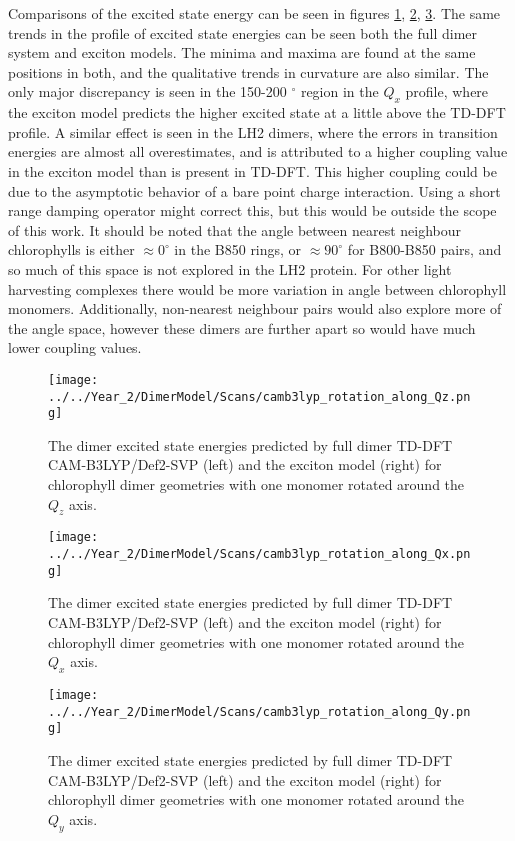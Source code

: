 Comparisons of the excited state energy can be seen in figures \ref{fig:camb3lyp_Qz_rotation},
\ref{fig:camb3lyp_Qx_rotation}, \ref{fig:camb3lyp_Qy_rotation}. The same trends 
in the profile of excited state energies can be seen both the full dimer system 
and exciton models. The minima and maxima are found at the same positions in both, 
and the qualitative trends in curvature are also similar. The only major discrepancy
is seen in the 150-200 $^{\circ}$ region in the $Q_x$ profile, where the exciton 
model predicts the higher excited state at a little above the TD-DFT profile. A 
similar effect is seen in the LH2 dimers, where the errors in transition energies 
are almost all overestimates, and is attributed to a higher coupling value in the
exciton model than is present in TD-DFT. This higher coupling could be due to the
asymptotic behavior of a bare point charge interaction. Using a short range damping
operator might correct this, but this would be outside the scope of this work.
It should be noted that the angle between nearest neighbour chlorophylls is either
$\approx 0 ^{\circ}$ in the B850 rings, or $\approx 90 ^{\circ}$ for B800-B850 pairs,
and so much of this space is not explored in the LH2 protein. For other light 
harvesting complexes there would be more variation in angle between chlorophyll 
monomers. Additionally, non-nearest neighbour pairs would also explore more of the 
angle space, however these dimers are further apart so would have much lower coupling
values.

\begin{figure}
    \centering
    \texttt{[image: ../../Year\_2/DimerModel/Scans/camb3lyp\_rotation\_along\_Qz.png]}
    \caption{The dimer excited state energies predicted by full dimer TD-DFT CAM-B3LYP/Def2-SVP (left)
    and the exciton model (right) for chlorophyll dimer geometries with one monomer
    rotated around the $Q_z$ axis.}
    \label{fig:camb3lyp_Qz_rotation}
\end{figure}

\begin{figure}
    \centering
    \texttt{[image: ../../Year\_2/DimerModel/Scans/camb3lyp\_rotation\_along\_Qx.png]}
    \caption{The dimer excited state energies predicted by full dimer TD-DFT CAM-B3LYP/Def2-SVP (left)
    and the exciton model (right) for chlorophyll dimer geometries with one monomer
    rotated around the $Q_x$ axis.}
    \label{fig:camb3lyp_Qx_rotation}
\end{figure}

\begin{figure}
    \centering
    \texttt{[image: ../../Year\_2/DimerModel/Scans/camb3lyp\_rotation\_along\_Qy.png]}
    \caption{The dimer excited state energies predicted by full dimer TD-DFT CAM-B3LYP/Def2-SVP (left)
    and the exciton model (right) for chlorophyll dimer geometries with one monomer
    rotated around the $Q_y$ axis.}
    \label{fig:camb3lyp_Qy_rotation}
\end{figure}

